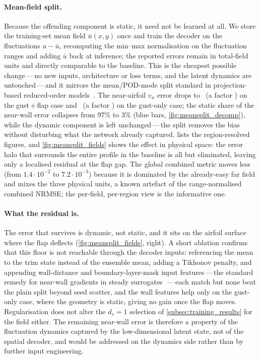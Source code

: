 \paragraph{Mean-field split.} Because the offending component is static, it need not be
learned at all. We store the training-set mean field $\bar{u}(x,y)$ once and train the
decoder on the fluctuations $u-\bar{u}$, recomputing the min--max normalisation on the
fluctuation ranges and adding $\bar{u}$ back at inference; the reported errors remain in
total-field units and directly comparable to the baseline. This is the cheapest possible
change\,---\,no new inputs, architecture or loss terms, and the latent dynamics are
untouched\,---\,and it mirrors the mean/POD-mode split standard in projection-based
reduced-order models~\cite{BennerGugercinWillcox2015}. The near-airfoil $v_x$ error drops to
\msCcMsNear\ (a factor \msCcFactor) on the gust\,+\,flap case and \msAMsNear\ (a factor
\msAFactor) on the gust-only case; the static share of the near-wall error collapses
from $97\%$ to $3\%$ (blue bars, \cref{fig:meansplit_decomp}), while the dynamic
component is left unchanged\,---\,the split removes the bias without disturbing what the
network already captured.  lists the region-resolved figures, and
\cref{fig:meansplit_fields} shows the effect in physical space: the error halo that
surrounds the entire profile in the baseline is all but eliminated, leaving only a
localised residual at the flap gap. The global combined metric moves less (from
$1.4\cdot10^{-2}$ to $7.2\cdot10^{-3}$) because it is dominated by the already-easy
far field and mixes the three physical units, a known artefact of the range-normalised
combined NRMSE; the per-field, per-region view is the informative one.

\paragraph{What the residual is.} The error that survives is dynamic, not static, and it
sits on the airfoil surface where the flap deflects (\cref{fig:meansplit_fields}, right).
A short ablation confirms that this floor is not reachable through the decoder inputs:
referencing the mean to the trim state instead of the ensemble mean, adding a
Tikhonov penalty, and appending wall-distance and boundary-layer-mask input
features\,---\,the standard remedy for near-wall gradients in steady
surrogates~\cite{Catalani2025}\,---\,each match but none beat the plain split beyond
seed scatter, and the wall features help only on the gust-only case, where the geometry
is static, giving no gain once the flap moves. Regularisation does not alter the
$d_s=1$ selection of \cref{subsec:training_results} for the field either. The remaining
near-wall error is therefore a property of the fluctuation dynamics captured by the
low-dimensional latent state, not of the spatial decoder, and would be addressed on the
dynamics side rather than by further input engineering.

